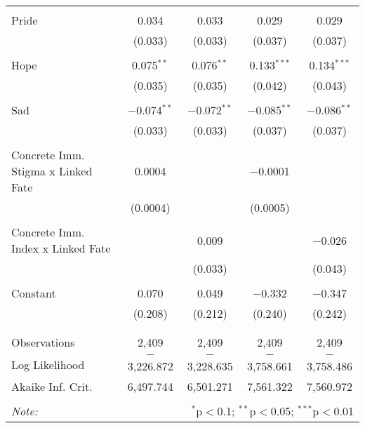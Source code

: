 \begin{table}[!htbp]
\begin{tabular}{@{\extracolsep{5pt}}lcccc}
  & & & & \\ 
 Pride & 0.034 & 0.033 & 0.029 & 0.029 \\ 
  & (0.033) & (0.033) & (0.037) & (0.037) \\ 
  & & & & \\ 
 Hope & 0.075$^{**}$ & 0.076$^{**}$ & 0.133$^{***}$ & 0.134$^{***}$ \\ 
  & (0.035) & (0.035) & (0.042) & (0.043) \\ 
  & & & & \\ 
 Sad & $-$0.074$^{**}$ & $-$0.072$^{**}$ & $-$0.085$^{**}$ & $-$0.086$^{**}$ \\ 
  & (0.033) & (0.033) & (0.037) & (0.037) \\ 
  & & & & \\ 
 Concrete Imm. Stigma x Linked Fate & 0.0004 &  & $-$0.0001 &  \\ 
  & (0.0004) &  & (0.0005) &  \\ 
  & & & & \\ 
 Concrete Imm. Index x Linked Fate &  & 0.009 &  & $-$0.026 \\ 
  &  & (0.033) &  & (0.043) \\ 
  & & & & \\ 
 Constant & 0.070 & 0.049 & $-$0.332 & $-$0.347 \\ 
  & (0.208) & (0.212) & (0.240) & (0.242) \\ 
  & & & & \\ 
\hline \\[-1.8ex] 
Observations & 2,409 & 2,409 & 2,409 & 2,409 \\ 
Log Likelihood & $-$3,226.872 & $-$3,228.635 & $-$3,758.661 & $-$3,758.486 \\ 
Akaike Inf. Crit. & 6,497.744 & 6,501.271 & 7,561.322 & 7,560.972 \\ 
\hline 
\hline \\[-1.8ex] 
\textit{Note:}  & \multicolumn{4}{r}{$^{*}$p$<$0.1; $^{**}$p$<$0.05; $^{***}$p$<$0.01} \\ 
\end{tabular} 
\end{table} 
